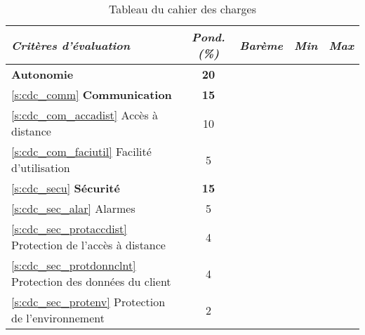 

\newpage

\begin{table}[htp]
	\caption{Tableau du cahier des charges}
	\label{t:cdc_tab}
	\centering
	\begin{tabular}{|l|c|c|c|c|}
		\hline\hline
		\textbf{\textit{Critères d’évaluation}} & \textbf{\textit{Pond. (\%)}} & \textbf{\textit{Barème}} & \textbf{\textit{Min}} & \textbf{\textit{Max}} \\
		\hline
		\hline
		\textbf{Autonomie} & \textbf{20} & & & \\
		\hline
		\hline
		\ref{s:cdc_comm} \textbf{Communication} & \textbf{15} & & & \\
		\ref{s:cdc_com_accadist} Accès à distance & 10 & & & \\
		\ref{s:cdc_com_faciutil} Facilité d’utilisation & 5 & & & \\
		\hline
		\hline
		\ref{s:cdc_secu} \textbf{Sécurité} & \textbf{15} & & & \\
		\ref*{s:cdc_sec_alar} Alarmes & 5 & & & \\
		\ref{s:cdc_sec_protaccdist} Protection de l’accès à distance & 4 & & & \\
		\ref{s:cdc_sec_protdonnclnt} Protection des données du client & 4 & & & \\
		\ref{s:cdc_sec_protenv} Protection de l’environnement & 2 & & & \\
		
		\hline
		\hline
	\end{tabular}
	
\end{table}